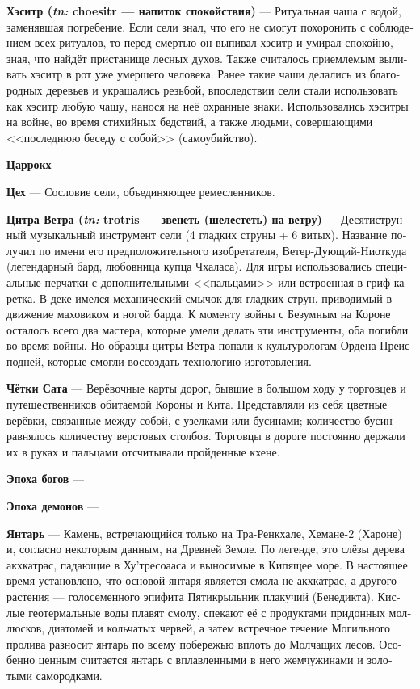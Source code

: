 \documentclass[a4paper,12pt,fleqn]{book}\usepackage{cooltooltips}\usepackage{polyglossia}\setdefaultlanguage[babelshorthands=true]{russian}\setotherlanguage{english}\defaultfontfeatures{Ligatures=TeX,Mapping=tex-text} \usepackage{xcolor}\definecolor{lightgray}{HTML}{bbbbbb}\color{lightgray}\newcommand{\ml}[3]{\textenglish{\textcolor{black}{#3}}}
\newcommand{\theterm}[3]{\textbf{\hypertarget{#1}{#2}} --- #3}
\newcommand{\theorigin}[3]{\textit{#1:} #2 --- #3}
\begin{document}
{\theterm{choesitr}
{Хэситр (\theorigin{tn}{choesitr}{напиток спокойствия})}
{Ритуальная чаша с водой, заменявшая погребение.
Если сели знал, что его не смогут похоронить с соблюдением всех ритуалов, то перед смертью он выпивал хэситр и умирал спокойно, зная, что найдёт пристанище лесных духов.
Также считалось приемлемым выливать хэситр в рот уже умершего человека.
Ранее такие чаши делались из благородных деревьев и украшались резьбой, впоследствии сели стали использовать как хэситр любую чашу, нанося на неё охранные знаки.
Использовались хэситры на войне, во время стихийных бедствий, а также людьми, совершающими <<последнюю беседу с собой>> (самоубийство).}

\theterm{tesarrokch}
{Царрокх}
{---}

\theterm{workshop}
{Цех}
{Сословие сели, объединяющее ремесленников.}

\theterm{windzither}
{Цитра Ветра (\theorigin{tn}{trotris}{звенеть (шелестеть) на ветру})}
{Десятиструнный музыкальный инструмент сели (4 гладких струны + 6 витых).
Название получил по имени его предположительного изобретателя, Ветер-Дующий-Ниоткуда (легендарный бард, любовница купца Чхаласа).
Для игры использовались специальные перчатки с дополнительными <<пальцами>> или встроенная в гриф каретка.
В деке имелся механический смычок для гладких струн, приводимый в движение маховиком и ногой барда.
К моменту войны с Безумным на Короне осталось всего два мастера, которые умели делать эти инструменты, оба погибли во время войны.
Но образцы цитры Ветра попали к культурологам Ордена Преисподней, которые смогли воссоздать технологию изготовления.}

\theterm{beads-of-sat}
{Чётки Сата}
{Верёвочные карты дорог, бывшие в большом ходу у торговцев и путешественников обитаемой Короны и Кита.
Представляли из себя цветные верёвки, связанные между собой, с узелками или бусинами;
количество бусин равнялось количеству верстовых столбов.
Торговцы в дороге постоянно держали их в руках и пальцами отсчитывали пройденные кхене.}

\theterm{gods-age}
{Эпоха богов}
{}

\theterm{daemons-age}
{Эпоха демонов} %
{}

\theterm{jasper}
{Янтарь}
{Камень, встречающийся только на Тра-Ренкхале, Хемане-2 (Хароне) и, согласно некоторым данным, на Древней Земле.
По легенде, это слёзы дерева акхкатрас, падающие в Ху'тресоааса и выносимые в Кипящее море.
В настоящее время установлено, что основой янтаря является смола не акхкатрас, а другого растения --- голосеменного эпифита Пятикрыльник плакучий (Бенедикта).
Кислые геотермальные воды плавят смолу, спекают её с продуктами придонных моллюсков, диатомей и кольчатых червей, а затем встречное течение Могильного пролива разносит янтарь по всему побережью вплоть до Молчащих лесов.
Особенно ценным считается янтарь с вплавленными в него жемчужинами и золотыми самородками.}

}
\end{document}
